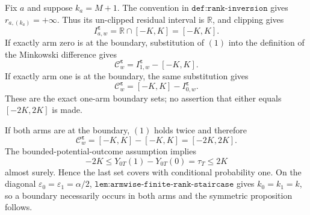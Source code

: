 Fix \(a\) and suppose \(k_a=M+1\). The convention in \(\texttt{def:rank-inversion}\) gives \(r_{a,(k_a)}=+\infty\). Thus its un-clipped residual interval is \(\mathbb R\), and clipping gives
\[
I^{\boldsymbol\varepsilon}_{a,w}=\mathbb R\cap[-K,K]=[-K,K].
\tag{1}
\]
If exactly arm zero is at the boundary, substitution of \((1)\) into the definition of the Minkowski difference gives
\[
\mathcal C^{\boldsymbol\varepsilon}_w=I^{\boldsymbol\varepsilon}_{1,w}-[-K,K].
\]
If exactly arm one is at the boundary, the same substitution gives
\[
\mathcal C^{\boldsymbol\varepsilon}_w=[-K,K]-I^{\boldsymbol\varepsilon}_{0,w}.
\]
These are the exact one-arm boundary sets; no assertion that either equals \([-2K,2K]\) is made.

If both arms are at the boundary, \((1)\) holds twice and therefore
\[
\mathcal C^{\boldsymbol\varepsilon}_w=[-K,K]-[-K,K]=[-2K,2K].
\]
The bounded-potential-outcome assumption implies
\[
-2K\le Y_{0T}(1)-Y_{0T}(0)=\tau_T\le2K
\]
almost surely. Hence the last set covers with conditional probability one. On the diagonal \(\varepsilon_0=\varepsilon_1=\alpha/2\), \(\texttt{lem:armwise-finite-rank-staircase}\) gives \(k_0=k_1=k\), so a boundary necessarily occurs in both arms and the symmetric proposition follows.
